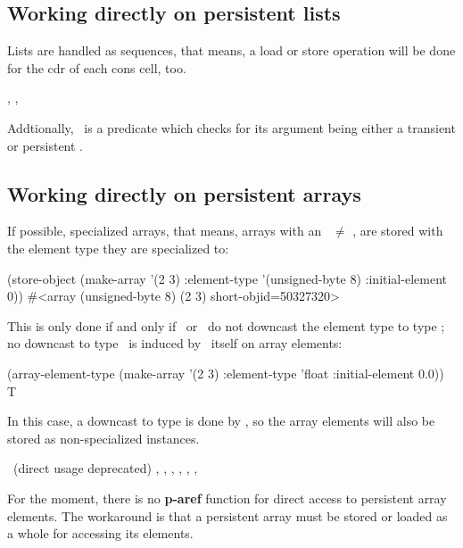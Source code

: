 \subsection[Persistent lists]{Working directly on persistent lists}

Lists are handled as sequences, that means, a load or store operation
will be done for the cdr of each cons cell, too.

\begin{NarrowRefList}
\Allocator {}
\Creator {}
\TypePredicate {}
\ObjectStore {}
\ObjectLoad {}
\SlotReader {}, 
\SlotWriter {}, 
\end{NarrowRefList}
Addtionally, \ is a predicate which checks for its
argument being either a transient or persistent \lispnil.

\subsection[Persistent arrays]{Working directly on persistent arrays}

If possible, specialized arrays, that means, arrays with an
\ $\neq$ , are stored with the element
type they are specialized to:
\begin{CompactCode}
\listener{}(store-object (make-array '(2 3)
                                       :element-type '(unsigned-byte 8)
                                       :initial-element 0))
#<array (unsigned-byte 8) (2 3) short-objid=50327320>
\end{CompactCode}

This is only done if and only if \lwcl\ or \allegrocl\ do not
downcast the element type to type ; no downcast to type
\ is induced by \plob\ itself on array elements:
\begin{CompactCode}
\listener{}(array-element-type (make-array '(2 3)
                                             :element-type 'float
                                             :initial-element 0.0))
T
\end{CompactCode}

In this case, a downcast to type  is done by \allegrocl, so
the array elements will also be stored as non-specialized instances.

\begin{NarrowRefList}
\Allocator {}
\TypePredicate {}
\ObjectStore {}
\ObjectLoad {}
\SlotAccessor {}\ (direct usage
  deprecated)
\Information {},
  , ,
  , ,
  , 
\end{NarrowRefList}
For the moment, there is no \textbf{p-aref} function for direct access
to persistent array elements. The workaround is that a persistent
array must be stored or loaded as a whole for accessing its
elements.


